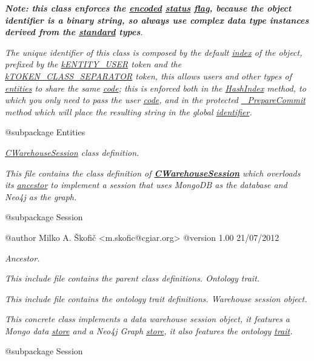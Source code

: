 {\itshape {\itshape {\bfseries Note\-: this class enforces the \hyperlink{}{encoded} \hyperlink{}{status} \hyperlink{}{flag}, because the object identifier is a binary string, so always use complex data type instances derived from the \hyperlink{class_c_data_type}{standard} types}}.}

{\itshape The unique identifier of this class is composed by the default \hyperlink{}{index} of the object, prefixed by the \hyperlink{}{k\-E\-N\-T\-I\-T\-Y\-\_\-\-U\-S\-E\-R} token and the \hyperlink{}{k\-T\-O\-K\-E\-N\-\_\-\-C\-L\-A\-S\-S\-\_\-\-S\-E\-P\-A\-R\-A\-T\-O\-R} token, this allows users and other types of \hyperlink{class_c_entity}{entities} to share the same \hyperlink{}{code}; this is enforced both in the \hyperlink{}{Hash\-Index} method, to which you only need to pass the user \hyperlink{}{code}, and in the protected \hyperlink{}{\-\_\-\-Prepare\-Commit} method which will place the resulting string in the global \hyperlink{}{identifier}.}

{\itshape \begin{DoxyVerb} @subpackage        Entities\end{DoxyVerb}
}

{\itshape {\itshape \hyperlink{class_c_warehouse_session}{C\-Warehouse\-Session}} class definition.}

{\itshape This file contains the class definition of {\bfseries \hyperlink{class_c_warehouse_session}{C\-Warehouse\-Session}} which overloads its \hyperlink{class_c_session_object}{ancestor} to implement a session that uses Mongo\-D\-B as the database and Neo4j as the graph.}

{\itshape \begin{DoxyVerb} @subpackage        Session

 @author            Milko A. Škofič <m.skofic@cgiar.org>
 @version   1.00 21/07/2012\end{DoxyVerb}
}

{\itshape Ancestor.}

{\itshape This include file contains the parent class definitions. Ontology trait.}

{\itshape This include file contains the ontology trait definitions. Warehouse session object.}

{\itshape This concrete class implements a data warehouse session object, it features a Mongo data \hyperlink{}{store} and a Neo4j Graph \hyperlink{}{store}, it also features the ontology \hyperlink{}{trait}.}

{\itshape \begin{DoxyVerb} @subpackage        Session\end{DoxyVerb}
}

